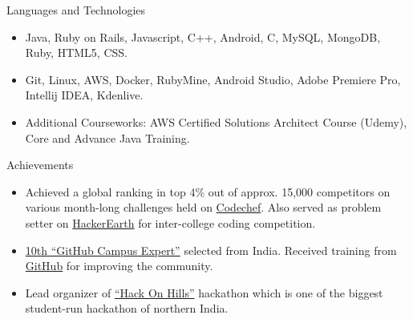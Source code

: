 \documentclass[]{mcdowellcv}
\begin{document}
	\begin{cvsection}{Languages and Technologies}
		\begin{cvsubsection}{}{}{}	
			\begin{itemize}
				\item Java, Ruby on Rails, Javascript, C++, Android, C, MySQL, MongoDB, Ruby, HTML5, CSS.
				\item Git, Linux, AWS, Docker, RubyMine, Android Studio, Adobe Premiere Pro, Intellij IDEA, Kdenlive.
				\item Additional Courseworks: AWS Certified Solutions Architect Course (Udemy), Core and Advance Java Training.
			\end{itemize}
		\end{cvsubsection}
	\end{cvsection}
	
	\begin{cvsection}{Achievements}
		\begin{cvsubsection}{}{}{}	
			\begin{itemize}
				\item Achieved a global ranking in top 4\% out of approx. 15,000 competitors on various month-long challenges held on \href {https://www.codechef.com/}{Codechef}. Also served as problem setter on \href {https://www.hackerearth.com/}{HackerEarth} for inter-college coding competition.
				\item {\href {https://githubcampus.expert/sukhbir-singh/}{10th ``GitHub Campus Expert''}} selected from India. Received training from \href {https://github.com/}{GitHub} for improving the community.
				\item Lead organizer of {\href {http://hackonhills.com/}{``Hack On Hills''}} hackathon which is one of the biggest student-run hackathon of northern India.
			\end{itemize}
		\end{cvsubsection}
	\end{cvsection}
	
\end{document}
